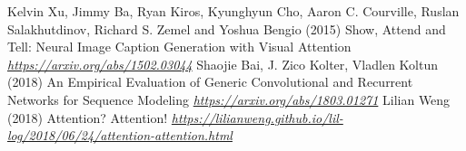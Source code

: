 \begin{vbframe}
{\begin{thebibliography}{99}
 Kelvin Xu, Jimmy Ba, Ryan Kiros, Kyunghyun Cho, Aaron C. Courville, Ruslan Salakhutdinov, Richard S. Zemel and  Yoshua Bengio (2015)
\newblock Show, Attend and Tell: Neural Image Caption Generation with Visual Attention
\newblock \emph{\url{https://arxiv.org/abs/1502.03044}}
 Shaojie Bai, J. Zico Kolter, Vladlen Koltun (2018)
\newblock An Empirical Evaluation of Generic Convolutional and Recurrent Networks for Sequence Modeling
\newblock \emph{\url{https://arxiv.org/abs/1803.01271}}
 Lilian Weng (2018)
\newblock Attention? Attention!
\newblock \emph{\url{https://lilianweng.github.io/lil-log/2018/06/24/attention-attention.html}}
\end{thebibliography}
}
\end{vbframe}

\endlecture
